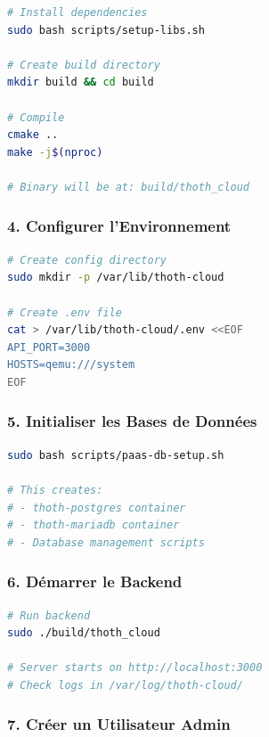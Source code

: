 \documentclass[12pt,a4paper]{article}
\begin{document}
\begin{lstlisting}[language=bash, caption=Compilation C++]
# Install dependencies
sudo bash scripts/setup-libs.sh

# Create build directory
mkdir build && cd build

# Compile
cmake ..
make -j$(nproc)

# Binary will be at: build/thoth_cloud
\end{lstlisting}

\subsubsection{4. Configurer l'Environnement}

\begin{lstlisting}[language=bash, caption=Configuration .env]
# Create config directory
sudo mkdir -p /var/lib/thoth-cloud

# Create .env file
cat > /var/lib/thoth-cloud/.env <<EOF
API_PORT=3000
HOSTS=qemu:///system
EOF
\end{lstlisting}

\subsubsection{5. Initialiser les Bases de Données}

\begin{lstlisting}[language=bash, caption=Setup bases partagées]
sudo bash scripts/paas-db-setup.sh

# This creates:
# - thoth-postgres container
# - thoth-mariadb container
# - Database management scripts
\end{lstlisting}

\subsubsection{6. Démarrer le Backend}

\begin{lstlisting}[language=bash, caption=Lancement du serveur]
# Run backend
sudo ./build/thoth_cloud

# Server starts on http://localhost:3000
# Check logs in /var/log/thoth-cloud/
\end{lstlisting}

\subsubsection{7. Créer un Utilisateur Admin}
\end{document}
